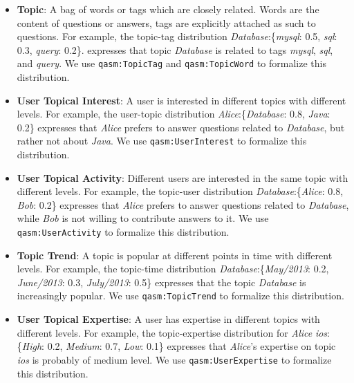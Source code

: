 \begin{itemize}
\item \textbf{Topic}: A bag of words or tags which are closely related. Words are the content of questions or answers, tags are explicitly attached as such to questions. For example, the topic-tag distribution \textit{Database}:\{\textit{mysql}: 0.5, \textit{sql}: 0.3, \textit{query}: 0.2\}. expresses that topic \textit{Database} is related to tags \textit{mysql}, \textit{sql}, and \textit{query}. We use \texttt{qasm:TopicTag} and \texttt{qasm:TopicWord} to formalize this distribution.

\item \textbf{User Topical Interest}: A user is interested in different topics with different levels. For example, the user-topic distribution \textit{Alice}:\{\textit{Database}: 0.8, \textit{Java}: 0.2\} expresses that \textit{Alice} prefers to answer questions related to \textit{Database}, but rather not about \textit{Java}. We use \texttt{qasm:UserInterest} to formalize this distribution.

\item \textbf{User Topical Activity}:  Different users are interested in the same topic with different levels. For example, the topic-user distribution \textit{Database}:\{\textit{Alice}: 0.8, \textit{Bob}: 0.2\} expresses that \textit{Alice} prefers to answer questions related to \textit{Database}, while \textit{Bob} is not willing to contribute answers to it. We use \texttt{qasm:UserActivity} to formalize this distribution.

\item \textbf{Topic Trend}: A topic is popular at different points in time with different levels. For example, the topic-time distribution \textit{Database}:\{\textit{May/2013}: 0.2, \textit{June/2013}: 0.3, \textit{July/2013}: 0.5\} expresses that the topic \textit{Database} is increasingly popular. 
We use \texttt{qasm:TopicTrend} to formalize this distribution.

\item \textbf{User Topical Expertise}: A user has expertise in different topics with different levels. For example, the topic-expertise distribution for \textit{Alice} \textit{ios}:\{\textit{High}: 0.2, \textit{Medium}: 0.7, \textit{Low}: 0.1\} expresses that \textit{Alice}'s expertise on topic \textit{ios} is probably of medium level. We use \texttt{qasm:UserExpertise} to formalize this distribution.
\end{itemize}


